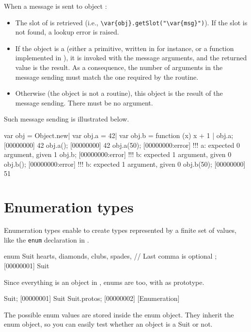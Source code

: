 When a message  is sent to object :

\begin{itemize}
\item The  slot of  is retrieved (i.e.,
  \lstinline[style=varInString]|\var{obj}.getSlot("\var{msg}")|). If the
  slot is not found, a lookup error is raised.
\item If the object is a  (either a primitive, written in \Cxx
  for instance, or a function implemented in \us), it is invoked with the
  message arguments, and the returned value is the result. As a consequence,
  the number of arguments in the message sending must match the one required
  by the routine.
\item Otherwise (the object is not a routine), this object is the result of
  the message sending. There must be no argument.
\end{itemize}

Such message sending is illustrated below.

\begin{urbiscript}
var obj = Object.new|
var obj.a = 42|
var obj.b = function (x) { x + 1 }|
obj.a;
[00000000] 42
obj.a();
[00000000] 42
obj.a(50);
[00000000:error] !!! a: expected 0 argument, given 1
obj.b;
[00000000:error] !!! b: expected 1 argument, given 0
obj.b();
[00000000:error] !!! b: expected 1 argument, given 0
obj.b(50);
[00000000] 51
\end{urbiscript}

\section{Enumeration types}
\label{sec:lang:enum}

Enumeration types enable to create types represented by a finite set of
values, like the \lstinline{enum} declaration in \C.

\begin{urbiscript}
enum Suit
{
  hearts,
  diamonds,
  clubs,
  spades, // Last comma is optional
};
[00000001] Suit
\end{urbiscript}

Since everything is an object in \us, enums are too, with
 as prototype.

\begin{urbiscript}
Suit;
[00000001] Suit
Suit.protos;
[00000002] [Enumeration]
\end{urbiscript}

The possible enum values are stored inside the enum object. They inherit the
enum object, so you can easily test whether an object is a Suit or not.

